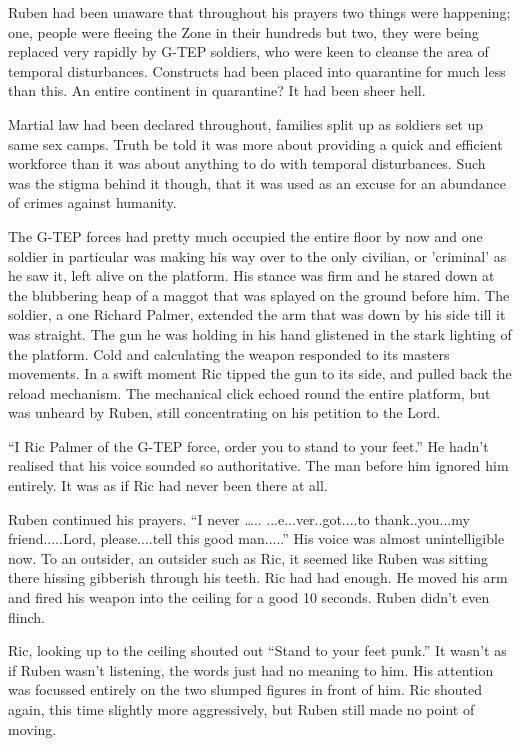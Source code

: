 Ruben had been unaware that throughout his prayers two things were happening; one, people were fleeing the Zone in their hundreds but two, they were being replaced very rapidly by G-TEP soldiers, who were keen to cleanse the area of temporal disturbances.  Constructs had been placed into quarantine for much less than this.  An entire continent in quarantine?  It had been sheer hell.  

Martial law had been declared throughout, families split up as soldiers set up same sex camps.  Truth be told it was more about providing a quick and efficient workforce than it was about anything to do with temporal disturbances.  Such was the stigma behind it though, that it was used as an excuse for an abundance of crimes against humanity.

The G-TEP forces had pretty much occupied the entire floor by now and one soldier in particular was making his way over to the only civilian, or 'criminal' as he saw it, left alive on the platform.  His stance was firm and he stared down at the blubbering heap of a maggot that was splayed on the ground before him.  The soldier, a one Richard Palmer, extended the arm that was down by his side till it was straight.  The gun he was holding in his hand glistened in the stark lighting of the platform.  Cold and calculating the weapon responded to its masters movements.  In a swift moment Ric tipped the gun to its side, and pulled back the reload mechanism.  The mechanical click echoed round the entire platform, but was unheard by Ruben, still concentrating on his petition to the Lord.

``I Ric Palmer of the G-TEP force, order you to stand to your feet.''  He hadn't realised that his voice sounded so authoritative.  The man before him ignored him entirely.  It was as if Ric had never been there at all.  

Ruben continued his prayers. ``I never ….. ...e...ver..got....to thank..you...my friend.....Lord, please....tell this good man.....''  His voice was almost unintelligible now.  To an outsider, an outsider such as Ric, it seemed like Ruben was sitting there hissing gibberish through his teeth.  Ric had had enough.  He moved his arm and fired his weapon into the ceiling for a good 10 seconds.  Ruben didn't even flinch.  

Ric, looking up to the ceiling shouted out ``Stand to your feet punk.''  It wasn't as if Ruben wasn't listening, the words just had no meaning to him.  His attention was focussed entirely on the two slumped figures in front of him.  Ric shouted again, this time slightly more aggressively, but Ruben still made no point of moving.  

